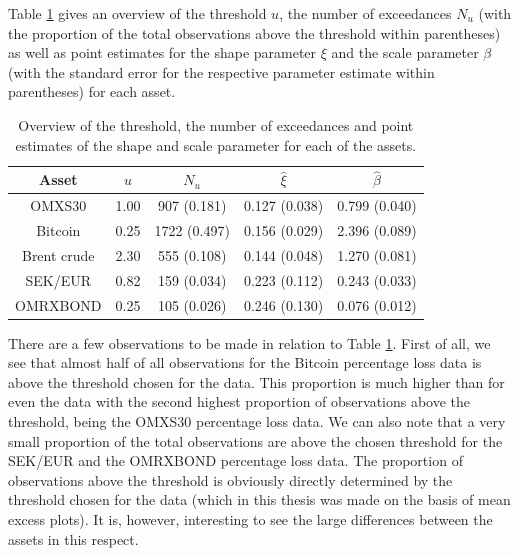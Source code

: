 \documentclass[a4paper,11pt]{article}
\theoremstyle{definition}
\theoremstyle{definition}
\theoremstyle{definition}
\theoremstyle{definition}
\theoremstyle{remark}
\begin{document}
Table \ref{tab:pointestimates} gives an overview of the threshold \(u\), the number of exceedances \(N_u\) (with the proportion of the total observations above the threshold within parentheses) as well as point estimates for the shape parameter \(\xi\) and the scale parameter \(\beta\) (with the standard error for the respective parameter estimate within parentheses) for each asset.
\begin{table}[H]

\caption{\label{tab:pointestimates}Overview of the threshold, the number of exceedances and point estimates of the shape and scale parameter for each of the assets.}
\centering
\begin{tabular}[t]{ccccc}
\toprule
\textbf{Asset} & \textbf{$u$} & \textbf{$N_u$} & \textbf{$\hat \xi$} & \textbf{$\hat \beta$}\\
\midrule
OMXS30 & 1.00 & 907 (0.181) & 0.127 (0.038) & 0.799 (0.040)\\
Bitcoin & 0.25 & 1722 (0.497) & 0.156 (0.029) & 2.396 (0.089)\\
Brent crude & 2.30 & 555 (0.108) & 0.144 (0.048) & 1.270 (0.081)\\
SEK/EUR & 0.82 & 159 (0.034) & 0.223 (0.112) & 0.243 (0.033)\\
OMRXBOND & 0.25 & 105 (0.026) & 0.246 (0.130) & 0.076 (0.012)\\
\bottomrule
\end{tabular}
\end{table}
There are a few observations to be made in relation to Table \ref{tab:pointestimates}. First of all, we see that almost half of all observations for the Bitcoin percentage loss data is above the threshold chosen for the data. This proportion is much higher than for even the data with the second highest proportion of observations above the threshold, being the OMXS30 percentage loss data. We can also note that a very small proportion of the total observations are above the chosen threshold for the SEK/EUR and the OMRXBOND percentage loss data. The proportion of observations above the threshold is obviously directly determined by the threshold chosen for the data (which in this thesis was made on the basis of mean excess plots). It is, however, interesting to see the large differences between the assets in this respect.
\end{document}
